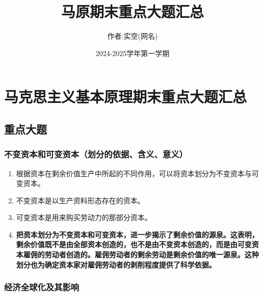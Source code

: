 \documentclass[12pt, a4paper, oneside]{ctexbook}
\title{{\Huge{\textbf{马原期末重点大题汇总}}}}
\author{作者:实空(网名)}
\date{2024-2025学年第一学期}
\begin{document}
\maketitle

\setcounter{page}{1}

\tableofcontents
\newpage
\setcounter{page}{1}

\chapter{马克思主义基本原理期末重点大题汇总}

\section{重点大题}

\subsection{不变资本和可变资本（划分的依据、含义、意义）}

\begin{enumerate}
\item 根据资本在剩余价值生产中所起的不同作用，可以将资本划分为不变资本与可变资本。
\item 不变资本是以生产资料形态存在的资本。
\item 可变资本是用来购买劳动力的那部分资本。
\item \textbf{把资本划分为不变资本和可变资本，进一步揭示了剩余价值的源泉。这表明，剩余价值既不是由全部资本创造的，也不是由不变资本创造的，而是由可变资本雇佣的劳动者创造的。雇佣劳动者的剩余劳动是剩余价值的唯一源泉。这种划分也为确定资本家对雇佣劳动者的剥削程度提供了科学依据。}
\end{enumerate}

\subsection{经济全球化及其影响}
\end{document}
